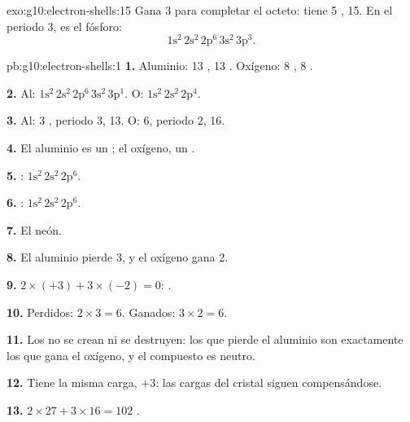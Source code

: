 \begin{solution}{exo:g10:electron-shells:15}
Gana 3  para completar el octeto: tiene 5 ,  15. En el periodo 3, es el fósforo:
\[ 1\mathrm{s}^2\,2\mathrm{s}^2\,2\mathrm{p}^6\,3\mathrm{s}^2\,3\mathrm{p}^3. \]
\end{solution}

\begin{solution}{pb:g10:electron-shells:1}
\textbf{1.} Aluminio: 13 , 13 . Oxígeno: 8 ,
8 .

\textbf{2.} Al: $1\mathrm{s}^2\,2\mathrm{s}^2\,2\mathrm{p}^6\,3\mathrm{s}^2\,3\mathrm{p}^1$.
O: $1\mathrm{s}^2\,2\mathrm{s}^2\,2\mathrm{p}^4$.

\textbf{3.} Al: 3 , periodo 3,  13. O: 6,
periodo 2,  16.

\textbf{4.} El aluminio es un ; el oxígeno, un .

\textbf{5.} : $1\mathrm{s}^2\,2\mathrm{s}^2\,2\mathrm{p}^6$.

\textbf{6.} : $1\mathrm{s}^2\,2\mathrm{s}^2\,2\mathrm{p}^6$.

\textbf{7.} El neón.

\textbf{8.} El aluminio pierde 3, y el oxígeno gana 2.

\textbf{9.} $2 \times (+3) + 3 \times (-2) = 0$: .

\textbf{10.} Perdidos: $2 \times 3 = 6$. Ganados: $3 \times 2 = 6$.

\textbf{11.} Los  no se crean ni se destruyen: los que pierde
el aluminio son exactamente los que gana el oxígeno, y el compuesto es
neutro.

\textbf{12.} Tiene la misma carga, $+3$: las cargas del cristal siguen
compensándose.

\textbf{13.} $2 \times 27 + 3 \times 16 = 102$ .


\end{solution}
